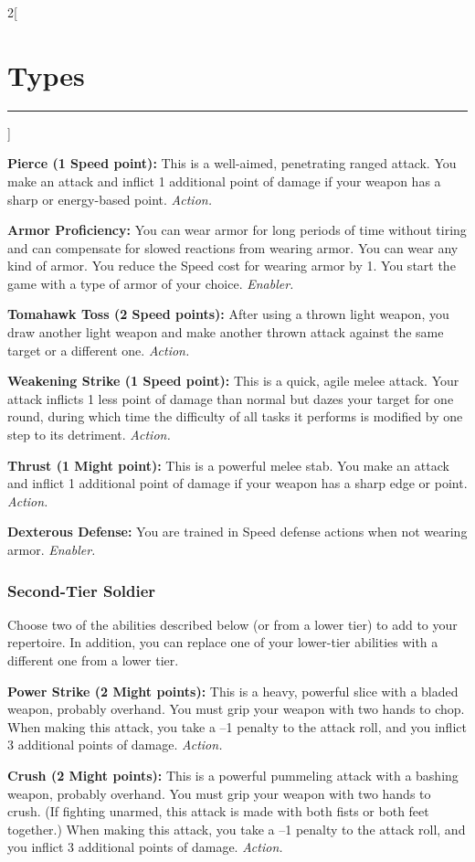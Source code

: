 \documentclass[a4paper,10pt,final]{book}
\newcommand{\HRule}{\rule{\linewidth}{0.5mm}} %
\newcommand{\newSection}[1]{\section*{#1} \addcontentsline{toc}{section}{#1} \label{sec:#1} \HRule}
\newcommand{\itemAbility}[2]{\textcolor{25gray}{\textbullet\textbf{ #1:}} {#2}\par}
\newcommand{\enabler}{\textit{ Enabler.}}
\newcommand{\action}{\textit{ Action.}}
\newenvironment{docsection}[1]
{
  \begin{multicols*}{2}[\newSection{#1}]
}
{
  \end{multicols*}
  \newpage
}
\begin{document}
\begin{docsection}{Types}
\itemAbility{Pierce (1 Speed point)}{This is a well-aimed, penetrating ranged attack. You make an attack and inflict 1 additional point of damage if your weapon has a sharp or energy-based point.\action}

\itemAbility{Armor Proficiency}{You can wear armor for long periods of time without tiring and can compensate for slowed reactions from wearing armor. You can wear any kind of armor. You reduce the Speed cost for wearing armor by 1. You start the game with a type of armor of your choice.\enabler}

\itemAbility{Tomahawk Toss (2 Speed points)}{After using a thrown light weapon, you draw another light weapon and make another thrown attack against the same target or a different one.\action}

\itemAbility{Weakening Strike (1 Speed point)}{This is a quick, agile melee attack. Your attack inflicts 1 less point of damage than normal but dazes your target for one round, during which time the difficulty of all tasks it performs is modified by one step to its detriment.\action}

\itemAbility{Thrust (1 Might point)}{This is a powerful melee stab. You make an attack and inflict 1 additional point of damage if your weapon has a sharp edge or point.\action}

\itemAbility{Dexterous Defense}{You are trained in Speed defense actions when not wearing armor.\enabler}


\subsubsection*{Second-Tier Soldier}
\label{subsub:soldierSecondTier}

Choose two of the abilities described below (or from a lower tier) to add to your repertoire. In addition, you can replace one of your lower-tier abilities with a different one from a lower tier.

\itemAbility{Power Strike (2 Might points)}{This is a heavy, powerful slice with a bladed weapon, probably overhand. You must grip your weapon with two hands to chop. When making this attack, you take a –1 penalty to the attack roll, and you inflict 3 additional points of damage.\action}

\itemAbility{Crush (2 Might points)}{This is a powerful pummeling attack with a bashing weapon, probably overhand. You must grip your weapon with two hands to crush. (If fighting unarmed, this attack is made with both fists or both feet together.) When making this attack, you take a –1 penalty to the attack roll, and you inflict 3 additional points of damage.\action}


\end{docsection}
\end{document}
